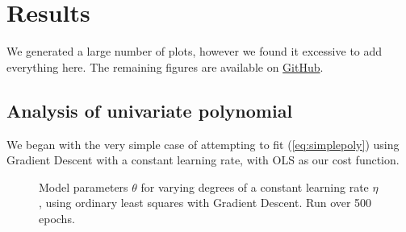 \documentclass{article}
\theoremstyle{definition}
\begin{document}
\newpage
\section{Results}
We generated a large number of plots, however we found it excessive to add everything here. The remaining figures are available on \href{https://github.com/augustfe/FYSSTK}{GitHub}.


\subsection{Analysis of univariate polynomial}
We began with the very simple case of attempting to fit (\ref{eq:simplepoly}) using Gradient Descent with a constant learning rate, with OLS as our cost function.
\begin{figure}[ht]%
    \centering
    \qquad
    \caption{Model parameters $\theta$ for varying degrees of a constant learning rate $\eta$, using ordinary least squares with Gradient Descent. Run over 500 epochs.}%
    \label{fig:GDconstanttheta}%
\end{figure}
\end{document}

